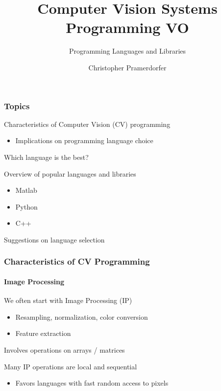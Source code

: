 \documentclass[xetex,professionalfont]{beamer}
\title{Computer Vision Systems Programming VO}
\subtitle{Programming Languages and Libraries}
\author{Christopher Pramerdorfer}
\institute{Computer Vision Lab, Vienna University of Technology}
\begin{document}

\begin{frame}
\maketitle
\end{frame}


\begin{frame}
\frametitle{Topics}

Characteristics of Computer Vision (CV) programming
\begin{itemize}
	\item Implications on programming language choice
\end{itemize}

\medskip
Which language is the best?

\medskip
Overview of popular languages and libraries
\begin{itemize}
	\item Matlab
	\item Python
	\item C++
\end{itemize}

\medskip
Suggestions on language selection

\end{frame}


\begin{frame}
\frametitle{Characteristics of CV Programming}
\framesubtitle{Image Processing}

We often start with Image Processing (IP)
\begin{itemize}
	\item Resampling, normalization, color conversion
	\item Feature extraction
\end{itemize}

\medskip
Involves operations on arrays / matrices

\medskip
Many IP operations are local and sequential
\begin{itemize}
	\item Favors languages with fast random access to pixels %
\end{itemize}

\end{frame}
\end{document}
